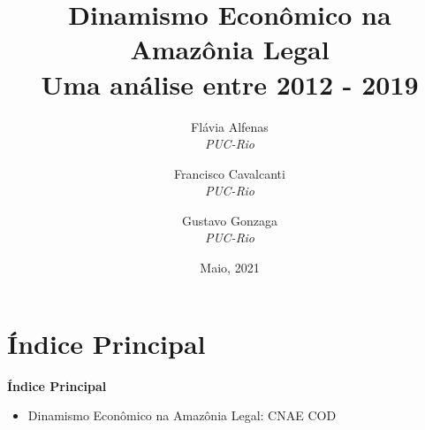 \documentclass[8pt]{beamer}
\author{
Flávia  Alfenas\\
\textit{PUC-Rio}\\ \vspace{3mm}
\and  
Francisco Cavalcanti\\
\textit{PUC-Rio}\\ \vspace{3mm}
\and   
Gustavo Gonzaga \\
\textit{PUC-Rio} 
}
\date{Maio, 2021}
\title{Dinamismo Econômico na Amazônia Legal \\ Uma análise entre 2012 - 2019}
\begin{document}

\begin{frame}
\titlepage
\end{frame}


\section{Índice Principal}

\begin{frame}[label=indice_principal]{}

\textbf{Índice Principal}
\vspace{2mm}
\begin{itemize}

\item{Dinamismo Econômico na Amazônia Legal:  CNAE	\hyperlink{amzcnae2dig}{} COD 	\hyperlink{amzcod2dig}{}}
\vspace{2mm}


\end{itemize}
\end{frame}
\end{document}
